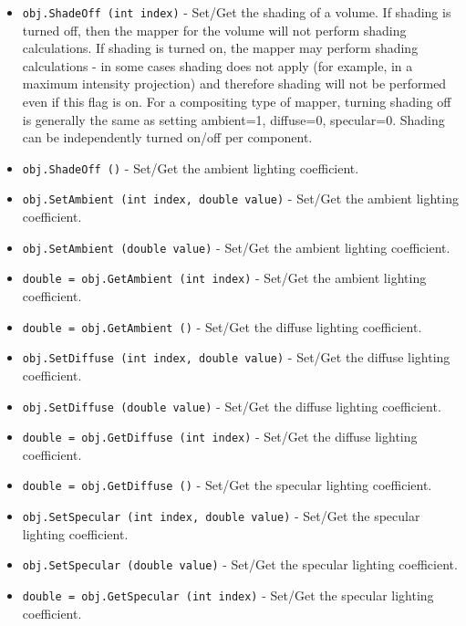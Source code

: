 \begin{itemize}
\item  \verb|obj.ShadeOff (int index)| -  Set/Get the shading of a volume. If shading is turned off, then
 the mapper for the volume will not perform shading calculations.
 If shading is turned on, the mapper may perform shading 
 calculations - in some cases shading does not apply (for example,
 in a maximum intensity projection) and therefore shading will
 not be performed even if this flag is on. For a compositing type
 of mapper, turning shading off is generally the same as setting
 ambient=1, diffuse=0, specular=0. Shading can be independently
 turned on/off per component.

\item  \verb|obj.ShadeOff ()| -  Set/Get the ambient lighting coefficient.

\item  \verb|obj.SetAmbient (int index, double value)| -  Set/Get the ambient lighting coefficient.

\item  \verb|obj.SetAmbient (double value)| -  Set/Get the ambient lighting coefficient.

\item  \verb|double = obj.GetAmbient (int index)| -  Set/Get the ambient lighting coefficient.

\item  \verb|double = obj.GetAmbient ()| -  Set/Get the diffuse lighting coefficient.

\item  \verb|obj.SetDiffuse (int index, double value)| -  Set/Get the diffuse lighting coefficient.

\item  \verb|obj.SetDiffuse (double value)| -  Set/Get the diffuse lighting coefficient.

\item  \verb|double = obj.GetDiffuse (int index)| -  Set/Get the diffuse lighting coefficient.

\item  \verb|double = obj.GetDiffuse ()| -  Set/Get the specular lighting coefficient.

\item  \verb|obj.SetSpecular (int index, double value)| -  Set/Get the specular lighting coefficient.

\item  \verb|obj.SetSpecular (double value)| -  Set/Get the specular lighting coefficient.

\item  \verb|double = obj.GetSpecular (int index)| -  Set/Get the specular lighting coefficient.


\end{itemize}
